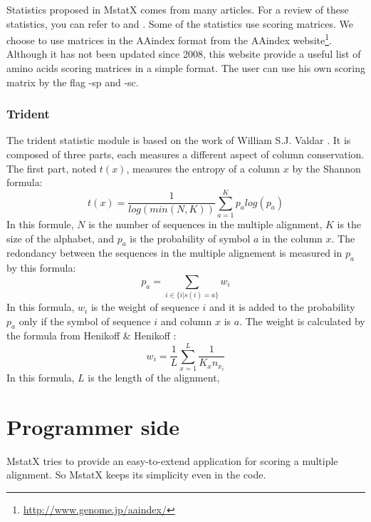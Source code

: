 \documentclass[12pt]{report}
\begin{document}
Statistics proposed in MstatX comes from many articles. For a review of these statistics, you can refer to  \cite{Valdar-2002} and  \cite{Johansson-2010}. Some of the statistics use scoring matrices. We choose to use matrices in the AAindex format \cite{Kawashima-2008} from the AAindex website\footnote{\url{http://www.genome.jp/aaindex/}}. Although it has not been updated since 2008, this website provide a useful list of amino acids scoring matrices in a simple format. The user can use his own scoring matrix by the flag -sp and -sc.

\subsubsection{Trident}
\label{trid_stat}
The trident statistic module is based on the work of William S.J. Valdar \cite{Valdar-2002}. 
It is composed of three parts, each measures a different aspect of column conservation.\\

The first part, noted $t(x)$, measures the entropy of a column $x$ by the Shannon formula:
\begin{equation}
 t(x) = \frac{1}{log(min(N,K))}\sum_{a=1}^{K}p_a log(p_a)
\end{equation}
In this formule, $N$ is the number of sequences in the multiple alignment, $K$ is the size of the alphabet, and $p_a$ is the probability of symbol $a$ in the column $x$. The redondancy between the sequences in the multiple alignement is measured in $p_a$ by this formula:
\begin{equation}
	p_a = \sum_{i \in \{i|s(i) = a\}} w_i
\end{equation}
In this formula, $w_i$ is the weight of sequence $i$ and it is added to the probability $p_a$ only if the symbol of sequence $i$ and column $x$ is $a$. The weight is calculated by the formula from Henikoff \& Henikoff \cite{Henikoff-1994}:
\begin{equation}
	w_i = \frac{1}{L} \sum_{x=1}^{L}\frac{1}{K_x n_{x_i}}
\end{equation}
In this formula, $L$ is the length of the alignment, 

\newpage
\section{Programmer side}
\label{prog_sec}
MstatX tries to provide an easy-to-extend application for scoring a multiple alignment.
So MstatX keeps its simplicity even in the code.\\
\end{document}
